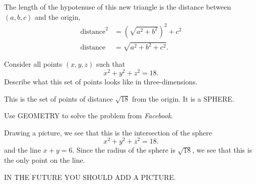 \documentclass[noauthor,nooutcomes,handout,12pt]{ximera}
\begin{document}
\begin{question}
\begin{freeResponse}
\begin{enumerate}
\begin{center}
    \end{center}
    The length of the hypotenuse of this new triangle is the distance
    between $(a,b,c)$ and the origin,
    \begin{align*}
      \text{distance}^2&= \left(\sqrt{a^2+b^2}\right)^2 + c^2\\
       \text{distance}&=  \sqrt{a^2+b^2 + c^2}.
    \end{align*}
    \end{enumerate}
  \end{freeResponse}
\end{question}
\mynewpage


\begin{question}
  Consider all points $(x,y,z)$ such that
  \[
  x^2 + y^2 + z^2 = 18.
  \]
  Describe what this set of points looks like in three-dimensions.
  \begin{freeResponse}
    This is the set of points of distance $\sqrt{18}$ from the
    origin. It is a SPHERE.
  \end{freeResponse}
\end{question}
\mynewpage


\begin{question}
  Use GEOMETRY to solve the problem from \textsl{Facebook}.
  \begin{freeResponse}
    Drawing a picture, we see that this is the intersection of the sphere
      \[
      x^2 + y^2 + z^2 = 18.
      \]
      and the line $x+y=6$. Since the radius of the sphere is
      $\sqrt{18}$, we see that this is the only point on the line.

      IN THE FUTURE YOU SHOULD ADD A PICTURE.
  \end{freeResponse}
\end{question}
\end{document}
